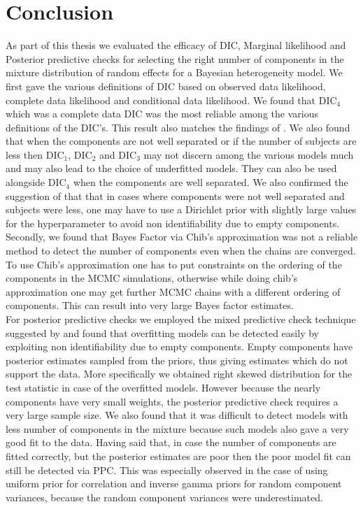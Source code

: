 
\chapter{Conclusion}
\label{ch : conclusion}

As part of this thesis we evaluated the efficacy of DIC, Marginal likelihood and Posterior predictive checks for selecting the right number of components in the mixture distribution of random effects for a Bayesian heterogeneity model. We first gave the various definitions of DIC based on observed data likelihood, complete data likelihood and conditional data likelihood. We found that $\text{DIC}_4$ which was a complete data DIC was the most reliable among the various definitions of the DIC's. This result also matches the findings of \citet{celeux_deviance_2006}. We also found that when the components are not well separated or if the number of subjects are less then $\text{DIC}_1$, $\text{DIC}_2$ and $\text{DIC}_3$ may not discern among the various models much and may also lead to the choice of underfitted models. They can also be used alongside $\text{DIC}_4$ when the components are well separated. We also confirmed the suggestion of \citet{fruhwirth-schnatter_finite_2013} that that in cases where components were not well separated and subjects were less, one may have to use a Dirichlet prior with slightly large values for the hyperparameter to avoid non identifiability due to empty components.\\

Secondly, we found that Bayes Factor via Chib's approximation was not a reliable method to detect the number of components even when the chains are converged. To use Chib's approximation one has to put constraints on the ordering of the components in the MCMC simulations, otherwise while doing chib's approximation one may get further MCMC chains with a different ordering of components. This can result into very large Bayes factor estimates.\\

For posterior predictive checks we employed the mixed predictive check technique suggested by \citet{marshall_approximate_2003} and found that overfitting models can be detected easily by exploiting non identifiability due to empty components. Empty components have posterior estimates sampled from the priors, thus giving estimates which do not support the data. More specifically we obtained right skewed distribution for the test statistic in case of the overfitted models. However because the nearly components have very small weights, the posterior predictive check requires a very large sample size. We also found that it was difficult to detect models with less number of components in the mixture because such models also gave a very good fit to the data. Having said that, in case the number of components are fitted correctly, but the posterior estimates are poor then the poor model fit can still be detected via PPC. This was especially observed in the case of using uniform prior for correlation and inverse gamma priors for random component variances, because the random component variances were underestimated.\\

